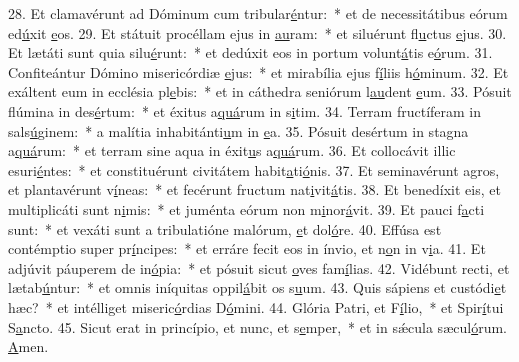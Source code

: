 28. Et clamavérunt ad Dóminum cum tribular\uline{é}ntur:~* et de necessitátibus eórum ed\uline{ú}xit \uline{e}os.
29. Et státuit procéllam ejus in \uline{au}ram:~* et siluérunt fl\uline{u}ctus \uline{e}jus.
30. Et lætáti sunt quia silu\uline{é}runt:~* et dedúxit eos in portum volunt\uline{á}tis e\uline{ó}rum.
31. Confiteántur Dómino misericórdiæ \uline{e}jus:~* et mirabília ejus f\uline{í}liis h\uline{ó}minum.
32. Et exáltent eum in ecclésia pl\uline{e}bis:~* et in cáthedra seniórum l\uline{au}dent \uline{e}um.
33. Pósuit flúmina in des\uline{é}rtum:~* et éxitus a\uline{quá}rum in s\uline{i}tim.
34. Terram fructíferam in sals\uline{ú}ginem:~* a malítia inhabitánti\uline{u}m in \uline{e}a.
35. Pósuit desértum in stagna a\uline{quá}rum:~* et terram sine aqua in éxit\uline{u}s a\uline{quá}rum.
36. Et collocávit illic esuri\uline{é}ntes:~* et constituérunt civitátem habit\uline{a}ti\uline{ó}nis.
37. Et seminavérunt agros, et plantavérunt v\uline{í}neas:~* et fecérunt fructum nat\uline{i}vit\uline{á}tis.
38. Et benedíxit eis, et multiplicáti sunt n\uline{i}mis:~* et juménta eórum non m\uline{i}nor\uline{á}vit.
39. Et pauci f\uline{a}cti sunt:~* et vexáti sunt a tribulatióne malórum, \uline{e}t dol\uline{ó}re.
40. Effúsa est contémptio super pr\uline{í}ncipes:~* et erráre fecit eos in ínvio, et n\uline{o}n in v\uline{i}a.
41. Et adjúvit páuperem de in\uline{ó}pia:~* et pósuit sicut \uline{o}ves fam\uline{í}lias.
42. Vidébunt recti, et lætab\uline{ú}ntur:~* et omnis iníquitas oppil\uline{á}bit os s\uline{u}um.
43. Quis sápiens et custódi\uline{e}t hæc?~* et intélliget miseric\uline{ó}rdias D\uline{ó}mini.
44. Glória Patri, et F\uline{í}lio,~* et Spir\uline{í}tui S\uline{a}ncto.
45. Sicut erat in princípio, et nunc, et s\uline{e}mper,~* et in sǽcula sæcul\uline{ó}rum. \uline{A}men.
